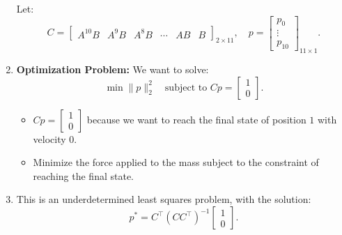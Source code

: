\begin{example}
\begin{enumerate}
        Let:
        \[
        C = \begin{bmatrix}
        A^{10} B & A^9 B & A^8 B & \cdots & AB & B
        \end{bmatrix}_{2 \times 11}, \quad 
        p = \begin{bmatrix}
        p_0 \\ 
        \vdots \\ 
        p_{10}
        \end{bmatrix}_{11 \times 1}.
        \]
        
        \item \textbf{Optimization Problem:} We want to solve:
        \[
        \min \|p\|_2^2 \quad \text{subject to } Cp = 
        \begin{bmatrix}
        1 \\ 
        0
        \end{bmatrix}.
        \]
        \begin{itemize}
            \item $Cp = \begin{bmatrix} 1 \\ 0 \end{bmatrix}$ because we want to reach the final state of position $1$ with velocity $0$.
            \item Minimize the force applied to the mass subject to the constraint of reaching the final state.
        \end{itemize}
        
        \item This is an underdetermined least squares problem, with the solution:
        \[
        p^* = C^\top (C C^\top)^{-1} 
        \begin{bmatrix}
        1 \\ 
        0
        \end{bmatrix}.
        \]
    \end{enumerate}
\end{example}
